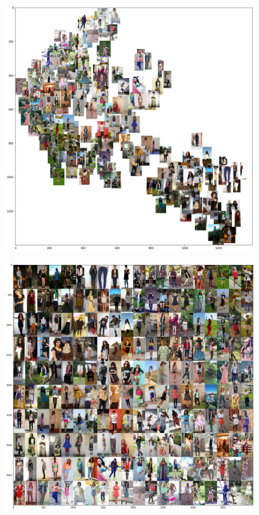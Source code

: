 \documentclass[12pt]{report}
\begin{document}
\begin{figure}
    \centering
    \includegraphics[scale=0.5]{images/resultados/tsne2.png}
    \caption{}
    \label{fig:tsne1}
\end{figure}

\begin{figure}
    \centering
    \includegraphics[scale=0.4]{images/resultados/rast1.png}
    \caption{}
    \label{fig:rast1}
\end{figure}
\end{document}
